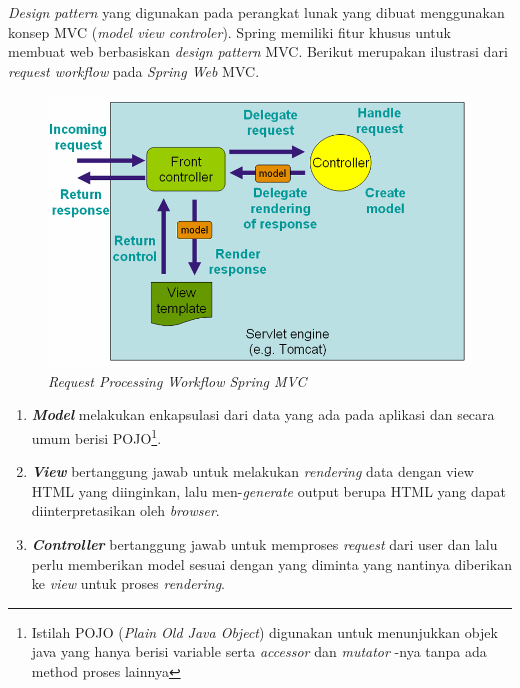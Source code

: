 \textit{Design pattern} yang digunakan pada perangkat lunak yang dibuat menggunakan konsep MVC (\textit{model view controler}). Spring memiliki fitur khusus untuk membuat web berbasiskan \textit{design pattern} MVC. Berikut merupakan ilustrasi dari \textit{request workflow} pada \textit{Spring Web} MVC.
\begin{figure}[H]
	\centering
	\includegraphics[scale=0.5]{GambarIO/mvc_springdocs}
	\caption[Request Processing Workflow Spring MVC]{\textit{Request Processing Workflow Spring MVC}\footnotemark}
	\label{fig:Request Processing Workflow Spring MVC}
\end{figure}

\begin{enumerate}
	\item \textit{\textbf{Model}} melakukan enkapsulasi dari data yang ada pada aplikasi dan secara umum berisi POJO\footnote{Istilah POJO (\textit{Plain Old Java Object}) digunakan untuk menunjukkan objek java yang hanya berisi variable serta \textit{accessor} dan \textit{mutator} -nya tanpa ada method proses lainnya}.
	
	\item \textit{\textbf{View}} bertanggung jawab untuk melakukan \textit{rendering} data dengan view HTML yang diinginkan, lalu men-\textit{generate} output berupa HTML yang dapat diinterpretasikan oleh \textit{browser}.

	\item \textit{\textbf{Controller}} bertanggung jawab untuk memproses \textit{request} dari user dan lalu perlu memberikan model sesuai dengan yang diminta yang nantinya diberikan ke \textit{view} untuk proses \textit{rendering}.
	
\end{enumerate}

